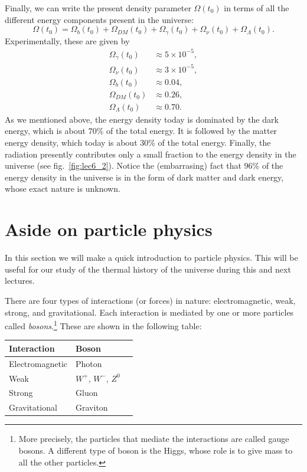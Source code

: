 \documentclass[11pt, a4paper,oneside,openright]{book}
\numberwithin{equation}{section}
\begin{document}
Finally, we can write the present density parameter $\Omega(t_0)$ in terms of all the different energy components present in the universe:
\begin{equation}
\Omega(t_0)=\Omega_b(t_0)+\Omega_{DM}(t_0)+\Omega_{\gamma}(t_0)+\Omega_{\nu}(t_0)+\Omega_{\Lambda}(t_0).
\end{equation}
Experimentally, these are given by
\begin{equation}
\begin{split}
\Omega_{\gamma}(t_0)&\approx 5\times10^{-5},\\
\Omega_{\nu}(t_0)&\approx 3\times10^{-5},\\
\Omega_{b}(t_0)&\approx 0.04,\\
\Omega_{DM}(t_0)&\approx 0.26,\\
\Omega_{\Lambda}(t_0)&\approx 0.70.
\end{split}
\end{equation}
As we mentioned above, the energy density today is dominated by the dark energy, which is about $70\%$ of the total energy. It is followed by the matter energy density, which today is about $30\%$ of the total energy. Finally, the radiation presently contributes only a small fraction to the energy density in the universe (see fig.\ \ref{fig:lec6_2}). Notice the (embarrasing) fact that $96\%$ of the energy density in the universe is in the form of dark matter and dark energy, whose exact nature is unknown.

\section{Aside on particle physics}

In this section we will make a quick introduction to particle physics. This will be useful for our study of the thermal history of the universe during this and next lectures.

There are four types of interactions (or forces) in nature: electromagnetic, weak, strong, and gravitational. Each interaction is mediated by one or more particles called {\it bosons}.\footnote{More precisely, the particles that mediate the interactions are called gauge bosons. A different type of boson is the Higgs, whose role is to give mass to all the other particles.} These are shown in the following table:
\begin{table}[ht]
\begin{center}
\begin{tabular}{p{4cm} l l} \hline\hline
Interaction & Boson  \\ \hline
Electromagnetic & Photon \\
Weak & $W^{+}$, $W^{-}$, $Z^0$ \\
Strong & Gluon \\
Gravitational & Graviton \\ \hline\hline
\end{tabular}
\end{center}
\end{table}
\end{document}
